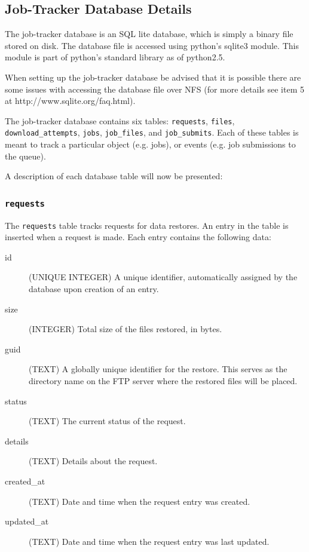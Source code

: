 \documentclass[12pt]{article}
\begin{document}
\subsection{Job-Tracker Database Details}
\label{sec:dbdetails}

The job-tracker database is an SQL lite database, which is simply a binary file stored on disk. The database file is accessed using python's sqlite3 module. This module is part of python's standard library as of python2.5. 

When setting up the job-tracker database be advised that it is possible there are some issues with accessing the database file over NFS (for more details see item 5 at http://www.sqlite.org/faq.html).

The job-tracker database contains six tables: \texttt{requests}, \texttt{files}, \texttt{download\_attempts}, \texttt{jobs}, \texttt{job\_files}, and \texttt{job\_submits}. Each of these tables is meant to track a particular object (e.g. jobs), or events (e.g. job submissions to the queue).

A description of each database table will now be presented:

\subsubsection{\texttt{requests}}
The \texttt{requests} table tracks requests for data restores. An entry in the table is inserted when a request is made. Each entry contains the following data:
\begin{description}
    \item[id] (UNIQUE INTEGER) A unique identifier, automatically assigned by the database upon creation of an entry.
    \item[size] (INTEGER) Total size of the files restored, in bytes.
    \item[guid] (TEXT) A globally unique identifier for the restore. This serves as the directory name on the FTP server where the restored files will be placed.
    \item[status] (TEXT) The current status of the request.
    \item[details] (TEXT) Details about the request.
    \item[created\_at] (TEXT) Date and time when the request entry was created.
    \item[updated\_at] (TEXT) Date and time when the request entry was last updated.
\end{description}
\end{document}
